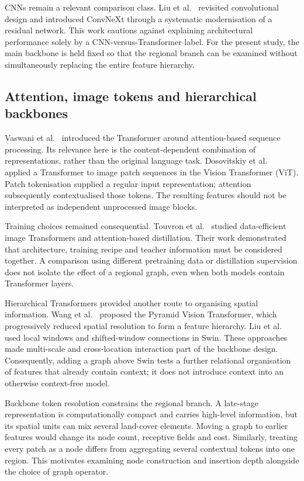 CNNs remain a relevant comparison class. Liu et al.~\cite{liu2022convnext}
revisited convolutional design and introduced ConvNeXt through a systematic
modernisation of a residual network. This work cautions against explaining
architectural performance solely by a CNN-versus-Transformer label. For the
present study, the main backbone is held fixed so that the regional branch
can be examined without simultaneously replacing the entire feature hierarchy.

\subsection{Attention, image tokens and hierarchical backbones}

Vaswani et al.~\cite{vaswani2017attention} introduced the Transformer around
attention-based sequence processing. Its relevance here is the content-dependent
combination of representations, rather than the original language task.
Dosovitskiy et al.~\cite{dosovitskiy2021vit} applied a Transformer to image
patch sequences in the Vision Transformer (ViT). Patch tokenisation supplied
a regular input representation; attention subsequently contextualised those
tokens. The resulting features should not be interpreted as independent
unprocessed image blocks.

Training choices remained consequential. Touvron
et al.~\cite{touvron2021deit} studied data-efficient image Transformers and
attention-based distillation. Their work demonstrated that architecture,
training recipe and teacher information must be considered together. A
comparison using different pretraining data or distillation supervision does
not isolate the effect of a regional graph, even when both models contain
Transformer layers.

Hierarchical Transformers provided another route to organising spatial
information. Wang et al.~\cite{wang2021pvt} proposed the Pyramid Vision
Transformer, which progressively reduced spatial resolution to form a
feature hierarchy. Liu et al.~\cite{liu2021swin} used local windows and
shifted-window connections in Swin. These approaches made multi-scale and
cross-location interaction part of the backbone design. Consequently, adding
a graph above Swin tests a further relational organisation of features that
already contain context; it does not introduce context into an otherwise
context-free model.

Backbone token resolution constrains the regional branch. A late-stage
representation is computationally compact and carries high-level information,
but its spatial units can mix several land-cover elements. Moving a graph to
earlier features would change its node count, receptive fields and cost.
Similarly, treating every patch as a node differs from aggregating several
contextual tokens into one region. This motivates examining node construction
and insertion depth alongside the choice of graph operator.

